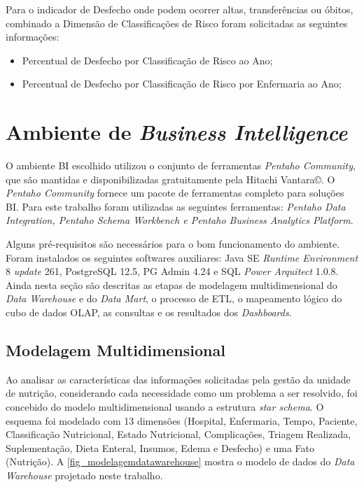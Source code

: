 Para o indicador de Desfecho onde podem ocorrer altas, transferências ou óbitos, combinado a Dimensão de Classificações de Risco foram solicitadas as seguintes informações:
\begin{itemize}
    \item Percentual de Desfecho por Classificação de Risco ao Ano;
    \item Percentual de Desfecho por Classificação de Risco por Enfermaria ao Ano;
\end{itemize}

\section{Ambiente de \textit{Business Intelligence}}

O ambiente BI escolhido utilizou o conjunto de ferramentas \textit{Pentaho Community}, que são mantidas e disponibilizadas gratuitamente pela Hitachi Vantara©. O \textit{Pentaho Community} fornece um pacote de ferramentas completo para soluções BI. Para este trabalho foram utilizadas as seguintes ferramentas: \textit{Pentaho Data Integration, Pentaho Schema Workbench e Pentaho Business Analytics Platform}.

Alguns pré-requisitos são necessários para o bom funcionamento do ambiente. Foram instalados os seguintes softwares auxiliares: Java SE \textit{Runtime Environment} 8 \textit{update} 261, PostgreSQL 12.5, PG Admin 4.24 e SQL \textit{Power Arquitect} 1.0.8. Ainda nesta seção são descritas as etapas de modelagem multidimensional do \textit{Data Warehouse} e do \textit{Data Mart}, o processo de ETL, o mapeamento lógico do cubo de dados OLAP, as consultas e os resultados dos \textit{Dashboards}.

\subsection{Modelagem Multidimensional}
Ao analisar as características das informações solicitadas pela gestão da unidade de nutrição, considerando cada necessidade como um problema a ser resolvido, foi concebido do modelo multidimensional usando a estrutura \textit{star schema}. O esquema foi modelado com 13 dimensões (Hospital, Enfermaria, Tempo, Paciente, Classificação Nutricional, Estado Nutricional, Complicações, Triagem Realizada, Suplementação, Dieta Enteral, Insumos, Edema e Desfecho) e uma Fato (Nutrição). A \autoref{fig_modelagemdatawarehouse} mostra o modelo de dados do \textit{Data Warehouse} projetado neste trabalho.

